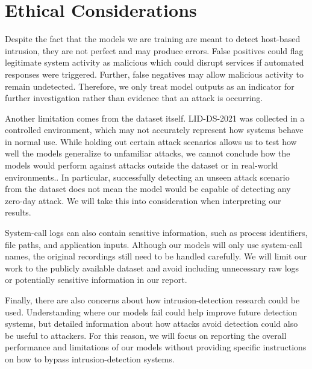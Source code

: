 \documentclass{article}
\begin{document}
\section{Ethical Considerations}
\label{sec:ethics}

Despite the fact that the models we are training are meant to detect host-based intrusion, they are not perfect and may produce errors. False positives could flag legitimate system activity as malicious which could disrupt services if automated responses were triggered. Further, false negatives may allow malicious activity to remain undetected. Therefore, we only treat model outputs as an indicator for further investigation rather than evidence that an attack is occurring.

Another limitation comes from the dataset itself. LID-DS-2021 was collected in a controlled environment, which may not accurately represent how systems behave in normal use. While holding out certain attack scenarios allows us to test how well the models generalize to unfamiliar attacks, we cannot conclude how the models would perform against attacks outside the dataset or in real-world environments.. In particular, successfully detecting an unseen attack scenario from the dataset does not mean the model would be capable of detecting any zero-day attack. We will take this into consideration when interpreting our results.

System-call logs can also contain sensitive information, such as process identifiers, file paths, and application inputs. Although our models will only use system-call names, the original recordings still need to be handled carefully. We will limit our work to the publicly available dataset and avoid including unnecessary raw logs or potentially sensitive information in our report.

Finally, there are also concerns about how intrusion-detection research could be used. Understanding where our models fail could help improve future detection systems, but detailed information about how attacks avoid detection could also be useful to attackers. For this reason, we will focus on reporting the overall performance and limitations of our models without providing specific instructions on how to bypass intrusion-detection systems.
\end{document}
